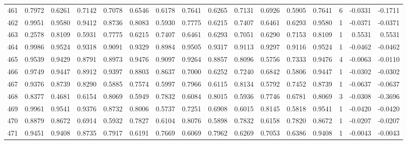 \begin{tabular}{lrrrrrrrrrrrrrrr}
461 &      0.7972 &  0.6261 &  0.7142 &  0.7078 &  0.6546 &  0.6178 &  0.7641 &  0.6265 &  0.7131 &  0.6926 &   0.5905 &     0.7641 &      6 &                   -0.0331 &                    -0.1711 \\
462 &      0.9951 &  0.9580 &  0.9412 &  0.8736 &  0.8083 &  0.5930 &  0.7775 &  0.6215 &  0.7407 &  0.6461 &   0.6293 &     0.9580 &      1 &                   -0.0371 &                    -0.0371 \\
463 &      0.2578 &  0.8109 &  0.5931 &  0.7775 &  0.6215 &  0.7407 &  0.6461 &  0.6293 &  0.7051 &  0.6290 &   0.7153 &     0.8109 &      1 &                    0.5531 &                     0.5531 \\
464 &      0.9986 &  0.9524 &  0.9318 &  0.9091 &  0.9329 &  0.8984 &  0.9505 &  0.9317 &  0.9113 &  0.9297 &   0.9116 &     0.9524 &      1 &                   -0.0462 &                    -0.0462 \\
465 &      0.9539 &  0.9429 &  0.8791 &  0.8973 &  0.9476 &  0.9097 &  0.9264 &  0.8857 &  0.8096 &  0.5756 &   0.7333 &     0.9476 &      4 &                   -0.0063 &                    -0.0110 \\
466 &      0.9749 &  0.9447 &  0.8912 &  0.9397 &  0.8803 &  0.8637 &  0.7000 &  0.6252 &  0.7240 &  0.6842 &   0.5806 &     0.9447 &      1 &                   -0.0302 &                    -0.0302 \\
467 &      0.9376 &  0.8739 &  0.8290 &  0.5885 &  0.7574 &  0.5997 &  0.7966 &  0.6115 &  0.8134 &  0.5792 &   0.7452 &     0.8739 &      1 &                   -0.0637 &                    -0.0637 \\
468 &      0.8377 &  0.4681 &  0.6154 &  0.8069 &  0.5949 &  0.7832 &  0.6084 &  0.8015 &  0.5936 &  0.7746 &   0.6781 &     0.8069 &      3 &                   -0.0308 &                    -0.3696 \\
469 &      0.9961 &  0.9541 &  0.9376 &  0.8732 &  0.8006 &  0.5737 &  0.7251 &  0.6908 &  0.6015 &  0.8145 &   0.5818 &     0.9541 &      1 &                   -0.0420 &                    -0.0420 \\
470 &      0.8879 &  0.8672 &  0.6914 &  0.5932 &  0.7827 &  0.6104 &  0.8076 &  0.5898 &  0.7832 &  0.6158 &   0.7820 &     0.8672 &      1 &                   -0.0207 &                    -0.0207 \\
471 &      0.9451 &  0.9408 &  0.8735 &  0.7917 &  0.6191 &  0.7669 &  0.6069 &  0.7962 &  0.6269 &  0.7053 &   0.6386 &     0.9408 &      1 &                   -0.0043 &                    -0.0043 \\

\end{tabular}
